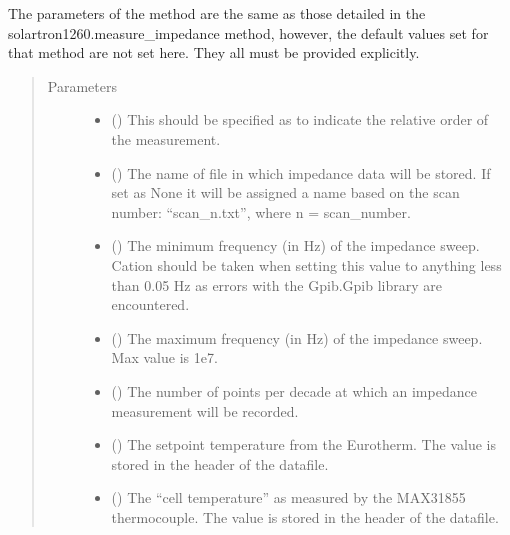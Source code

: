 \documentclass[letterpaper,10pt,english]{sphinxmanual}
\begin{document}
\begin{fulllineitems}
\begin{fulllineitems}
The parameters of the method are the same as those detailed in the
solartron1260.measure\_impedance method, however, the default values
set for that method are not set here. They all must be provided
explicitly.
\begin{quote}\begin{description}
\item[{Parameters}] \leavevmode\begin{itemize}
\item {} 
 () \textendash{} This should be specified as to indicate the relative order of the
measurement.

\item {} 
 (\sphinxstyleliteralemphasis{\sphinxupquote{, }}) \textendash{} The name of file in which impedance data will be
stored. If set as None it will be assigned a name based on the
scan number: “scan\_n.txt”, where n = scan\_number.

\item {} 
 () \textendash{} The minimum frequency (in Hz) of the impedance sweep.
Cation should be taken when setting this value to anything less
than 0.05 Hz as errors with the Gpib.Gpib library are encountered.

\item {} 
 () \textendash{} The maximum frequency (in Hz) of the impedance sweep. Max value is
1e7.

\item {} 
 () \textendash{} The number of points per decade at which an impedance measurement
will be recorded.

\item {} 
 () \textendash{} The setpoint temperature from the Eurotherm. The value is stored
in the header of the datafile.

\item {} 
 () \textendash{} The “cell temperature” as measured by the MAX31855 thermocouple.
The value is stored in the header of the datafile.


\end{itemize}
\end{description}
\end{quote}
\end{fulllineitems}
\end{fulllineitems}
\end{document}
